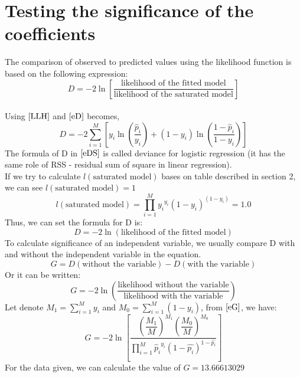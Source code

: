 \documentclass{article}
\begin{document}
\section {Testing the significance of the coefficients} 
    The comparison of observed to predicted values using the likelihood function is based on the following expression:
    \begin{equation} 
        \label{eD}
        D = -2\ln\left[\dfrac{\text{likelihood of the fitted model}}{\text{likelihood of the saturated model}} \right]
    \end{equation}
    \\
    Using $\ref{LLH}$ and $\ref{eD}$ becomes, 
    \\
    \begin{equation} 
        \label{eDS}
        D = -2 \sum_{i=1}^{M} \left[y_{i}\ln\left(\dfrac{\hat{p}_{i}}{y_{i}} \right) + (1 - y_{i})\ln\left(\dfrac{1 - \hat{p}_{i}}{1 - y_{i}} \right)\right]
    \end{equation}
    The formula of D in $\ref{eDS}$ is called deviance for logistic regression (it has the same role of RSS - residual sum of square in linear regression).
    \\ 
    If we try to calculate $l(\text{saturated model})$ bases on table described in section 2, we can see  ${l(\text{saturated model}) = 1}$
    \\
    \begin{equation} 
         l(\text{saturated model}) = \prod_{i=1}^{M} {y_{i}}^{y_{i}} (1 - y_{i})^{(1 - y_{i})} = 1.0
    \end{equation}
    Thus, we can set the formula for D is: 
    \begin{equation} 
        D = -2\ln(\text{likelihood of the fitted model})
    \end{equation} 
    To calculate significance of an independent variable, we usually compare D with and without the independent variable in the equation. 
    \begin{equation} 
        G = D(\text{without the variable} ) - D(\text{with the variable})
    \end{equation} 
    Or it can be written: 
    \begin{equation} 
        \label{eG}
        G   = -2\ln\left(\dfrac{\text{likelihood without the variable}}{\text{likelihood with the variable}}\right)
    \end{equation} 
    Let denote $M_{1} = \sum_{i=1}^{M} y_{i}$ and $M_{0} = \sum_{i=1}^{M} (1 - y_{i})$, from $\ref{eG}$, we have: 
    \begin{equation} 
        G = -2 \ln \left[ \dfrac{\left(\dfrac{M_{1}}{M}\right)^{M_{1}}\left(\dfrac{M_{0}}{M}\right)^{M_{0}} }{\prod_{i=1}^{M} {\hat{p}_{i}}^{y_{i}} (1 - \hat{p_{i}})^{1 - \hat{p_{i}}}}\right]
    \end{equation}
    For the data given, we can calculate the value of $G = 13.66613029$
        
\end{document}

